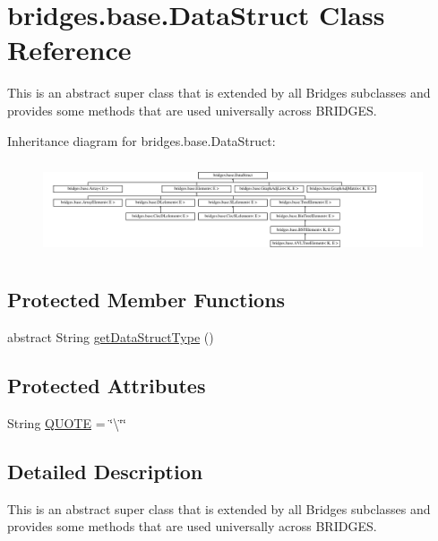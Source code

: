 \hypertarget{classbridges_1_1base_1_1_data_struct}{}\section{bridges.\+base.\+Data\+Struct Class Reference}
\label{classbridges_1_1base_1_1_data_struct}


This is an abstract super class that is extended by all Bridges subclasses and provides some methods that are used universally across B\+R\+I\+D\+G\+E\+S.  


Inheritance diagram for bridges.\+base.\+Data\+Struct\+:\begin{figure}[H]
\begin{center}
\leavevmode
\includegraphics[height=2.788382cm]{classbridges_1_1base_1_1_data_struct}
\end{center}
\end{figure}
\subsection*{Protected Member Functions}
\begin{DoxyCompactItemize}
\item 
abstract String \hyperlink{classbridges_1_1base_1_1_data_struct_a3bae9d0d68a85e517a34be482e90fdd4}{get\+Data\+Struct\+Type} ()
\end{DoxyCompactItemize}
\subsection*{Protected Attributes}
\begin{DoxyCompactItemize}
\item 
String \hyperlink{classbridges_1_1base_1_1_data_struct_aac4a6ea28f44676274120ba1dddafc1f}{Q\+U\+O\+T\+E} = \char`\"{}\textbackslash{}\char`\"{}\char`\"{}
\end{DoxyCompactItemize}


\subsection{Detailed Description}
This is an abstract super class that is extended by all Bridges subclasses and provides some methods that are used universally across B\+R\+I\+D\+G\+E\+S. 

